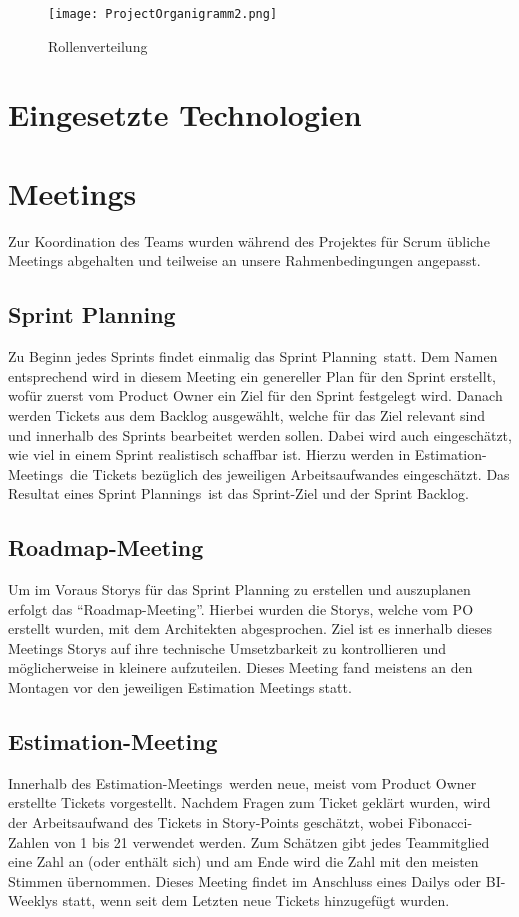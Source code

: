     \begin{figure}[!hbt]
        \texttt{[image: ProjectOrganigramm2.png]}
        \caption{Rollenverteilung}
        \label{fig:Rollenverteilung}
    \end{figure}
    
\section{Eingesetzte Technologien}

\section{Meetings}
Zur Koordination des Teams wurden während des Projektes für Scrum übliche Meetings abgehalten und teilweise an unsere Rahmenbedingungen angepasst.

\subsection{Sprint Planning}
Zu Beginn jedes Sprints findet einmalig das \glqq Sprint Planning\grqq~statt. Dem Namen entsprechend wird in diesem Meeting ein genereller Plan 
für den Sprint erstellt, wofür zuerst vom Product Owner ein Ziel für den Sprint festgelegt wird. Danach werden Tickets aus dem Backlog 
ausgewählt, welche für das Ziel relevant sind und innerhalb des Sprints bearbeitet werden sollen. Dabei wird auch eingeschätzt, wie viel in einem 
Sprint realistisch schaffbar ist. Hierzu werden in \glqq Estimation-Meetings\grqq~die Tickets bezüglich des jeweiligen Arbeitsaufwandes eingeschätzt.
Das Resultat eines \glqq Sprint Plannings\grqq~ist das Sprint-Ziel und der Sprint Backlog.

\subsection{Roadmap-Meeting}
Um im Voraus Storys für das Sprint Planning zu erstellen und auszuplanen erfolgt das \enquote{Roadmap-Meeting}.
Hierbei wurden die Storys, welche vom PO erstellt wurden, mit dem Architekten abgesprochen.
Ziel ist es innerhalb dieses Meetings Storys auf ihre technische Umsetzbarkeit zu kontrollieren und möglicherweise in kleinere aufzuteilen.
Dieses Meeting fand meistens an den Montagen vor den jeweiligen Estimation Meetings statt.

\subsection{Estimation-Meeting}
Innerhalb des \glqq Estimation-Meetings\grqq~werden neue, meist vom Product Owner erstellte Tickets vorgestellt. Nachdem Fragen zum Ticket
geklärt wurden, wird der Arbeitsaufwand des Tickets in Story-Points geschätzt, wobei Fibonacci-Zahlen von 1 bis 21 verwendet werden. Zum Schätzen
gibt jedes Teammitglied eine Zahl an (oder enthält sich) und am Ende wird die Zahl mit den meisten Stimmen übernommen. 
Dieses Meeting findet im Anschluss eines Dailys oder BI-Weeklys statt, wenn seit dem Letzten neue Tickets hinzugefügt wurden.


